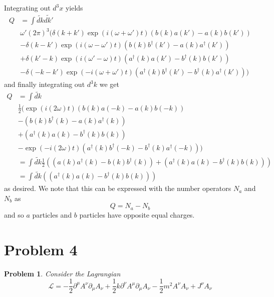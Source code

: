 \documentclass[fontsize=11pt]{scrartcl} %
\numberwithin{equation}{section} %
\numberwithin{figure}{section} %
\numberwithin{table}{section} %
\newtheorem*{problem}{Problem}
\begin{document}
Integrating out $d^3x$ yields
\[
    \begin{aligned}
        Q &= \int \tilde{dk}\tilde{dk'}\\
        &\omega'(2\pi)^3(
            \delta(k+k')\exp(i(\omega+\omega')t)(b(k)a(k') - a(k)b(k'))\\
            &-\delta(k-k')\exp(i(\omega-\omega')t)(b(k)b^{\dagger}(k') - a(k)a^{\dagger}(k'))\\
            &+\delta(k'-k)\exp(i(\omega'-\omega)t)(a^{\dagger}(k)a(k') - b^{\dagger}(k)b(k'))\\
            &-\delta(-k-k')\exp(-i(\omega+\omega')t)(a^{\dagger}(k)b^{\dagger}(k')
                -
            b^{\dagger}(k)a^{\dagger}(k'))
        )
    \end{aligned}
\]
and finally integrating out $d^3k$ we get
\[
    \begin{aligned}
        Q &= \int \tilde{dk}\\
        &\frac{1}{2}(
            \exp(i(2\omega)t)(b(k)a(-k) - a(k)b(-k))\\
            &-(b(k)b^{\dagger}(k) - a(k)a^{\dagger}(k))\\
            &+(a^{\dagger}(k)a(k) - b^{\dagger}(k)b(k))\\
            &-\exp(-i(2\omega)t)(a^{\dagger}(k)b^{\dagger}(-k) -
            b^{\dagger}(k)a^{\dagger}(-k))
        )\\
        &= \int \tilde{dk}
        \frac{1}{2}(
            (a(k)a^{\dagger}(k) - b(k)b^{\dagger}(k))
            +(a^{\dagger}(k)a(k) - b^{\dagger}(k)b(k))
        )\\
        &= \int \tilde{dk}
        (
            (a^{\dagger}(k)a(k) - b^{\dagger}(k)b(k))
        )
    \end{aligned}
\]
as desired. We note that this can be expressed with the number operators $N_a$
and $N_b$ as
\[
    Q = N_a - N_b
\]
and so $a$ particles and $b$ particles have opposite equal charges.

\newpage

\section*{Problem 4}
\begin{problem}
    Consider the Lagrangian
    \[
        \mathscr{L} = -\frac{1}{2}\partial^{\mu}A^{\nu}\partial_{\mu}A_{\nu}
        +\frac{1}{2}k\partial^{\nu}A^{\mu}\partial_{\mu}A_{\nu}
        -\frac{1}{2}m^2A^{\nu}A_{\nu} + J^{\nu}A_{\nu}
    \]
\end{problem}
\end{document}
